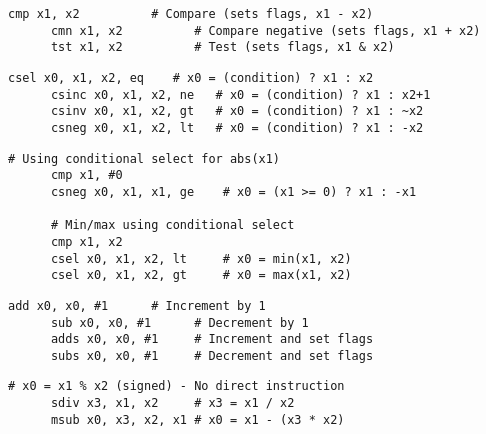   \begin{definition}
    \begin{lstlisting}[language=arm]
      cmp x1, x2          # Compare (sets flags, x1 - x2)
      cmn x1, x2          # Compare negative (sets flags, x1 + x2)
      tst x1, x2          # Test (sets flags, x1 & x2)
    \end{lstlisting}
  \end{definition}

  \begin{definition}
    \begin{lstlisting}[language=arm]
      csel x0, x1, x2, eq    # x0 = (condition) ? x1 : x2
      csinc x0, x1, x2, ne   # x0 = (condition) ? x1 : x2+1
      csinv x0, x1, x2, gt   # x0 = (condition) ? x1 : ~x2
      csneg x0, x1, x2, lt   # x0 = (condition) ? x1 : -x2
    \end{lstlisting}
  \end{definition}

  \begin{definition}
    \begin{lstlisting}[language=arm]
      # Using conditional select for abs(x1)
      cmp x1, #0
      csneg x0, x1, x1, ge    # x0 = (x1 >= 0) ? x1 : -x1
      
      # Min/max using conditional select
      cmp x1, x2
      csel x0, x1, x2, lt     # x0 = min(x1, x2)
      csel x0, x1, x2, gt     # x0 = max(x1, x2)
    \end{lstlisting}
  \end{definition}

  \begin{definition}
    \begin{lstlisting}[language=arm]
      add x0, x0, #1      # Increment by 1
      sub x0, x0, #1      # Decrement by 1
      adds x0, x0, #1     # Increment and set flags
      subs x0, x0, #1     # Decrement and set flags
    \end{lstlisting}
  \end{definition}

  \begin{definition}
    \begin{lstlisting}[language=arm]
      # x0 = x1 % x2 (signed) - No direct instruction
      sdiv x3, x1, x2     # x3 = x1 / x2
      msub x0, x3, x2, x1 # x0 = x1 - (x3 * x2)
    \end{lstlisting}
  \end{definition}

